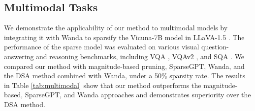 \subsection{Multimodal Tasks}\label{sec:multimodal_tasks}
We demonstrate the applicability of our method to multimodal models by integrating it with Wanda to sparsify the Vicuna-7B model \citep{chiang2023vicuna} in LLaVA-1.5 \citep{liu2024improved}. The performance of the sparse model was evaluated on various visual question-answering and reasoning benchmarks, including VQA \citep{singh2019towards}, VQAv2 \citep{goyal2017making}, and SQA \citep{lu2022learn}. We compared our method with magnitude-based pruning, SparseGPT, Wanda, and the DSA method combined with Wanda, under a 50$\%$ sparsity rate. The results in Table \ref{tab:multimodal} show that our method outperforms the magnitude-based, SparseGPT, and Wanda approaches and demonstrates superiority over the DSA method.
\begin{table}[h!]
    \centering
    \caption{The performance improvement of the ATP method on sparse multimodal models.}
\end{table}

